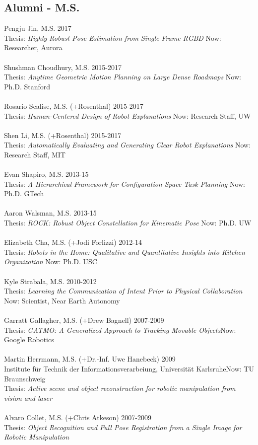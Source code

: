 \subsection{Alumni - M.S.}
\noindent
Pengju Jin, M.S. \hfill 2017\\
Thesis: \textit{Highly Robust Pose Estimation from Single Frame RGBD}
\hfill Now: Researcher, Aurora\\
\\
Shushman Choudhury, M.S. \hfill 2015-2017\\
Thesis: \textit{Anytime Geometric Motion Planning on Large Dense Roadmaps} \hfill Now: Ph.D. Stanford\\
\\
Rosario Scalise, M.S. (+Rosenthal) \hfill 2015-2017\\
Thesis: \textit{Human-Centered Design of Robot Explanations} \hfill Now: Research Staff, UW\\
\\
Shen Li, M.S. (+Rosenthal) \hfill 2015-2017\\
Thesis: \textit{Automatically Evaluating and Generating Clear Robot Explanations} \hfill Now: Research Staff, MIT\\
\\
Evan Shapiro, M.S.  \hfill 2013-15\\
Thesis: \textit{A Hierarchical Framework for Configuration Space Task Planning} \hfill Now: Ph.D. GTech\\
\\
Aaron Walsman, M.S.  \hfill 2013-15\\
Thesis: \textit{ROCK: Robust Object Constellation for Kinematic Pose} \hfill Now: Ph.D. UW\\
\\
Elizabeth Cha, M.S. (+Jodi Forlizzi)  \hfill 2012-14\\
Thesis: \textit{Robots in the Home: Qualitative and Quantitative Insights into Kitchen Organization} \hfill Now: Ph.D. USC\\
\\
Kyle Strabala, M.S. \hfill 2010-2012\\
Thesis: \textit{Learning the Communication of Intent Prior to Physical Collaboration} \hfill Now: Scientist, Near Earth Autonomy\\
\\
Garratt Gallagher, M.S. (+Drew Bagnell) \hfill 2007-2009\\ 
Thesis: \textit{GATMO: A Generalized Approach to Tracking Movable Objects}\hfill Now: Google Robotics\\
\\
Martin Herrmann, M.S. (+Dr.-Inf. Uwe Hanebeck) \hfill 2009\\
Institute f\"ur Technik der Informationsverarbeiung, Universit\"at Karlsruhe\hfill Now: TU Braunschweig\\
Thesis: \textit{Active scene and object reconstruction for robotic manipulation from vision and laser}\\
\\
Alvaro Collet, M.S. (+Chris Atkeson) \hfill 2007-2009\\
Thesis: \textit{Object Recognition and Full Pose Registration from a Single Image for Robotic Manipulation}\\
